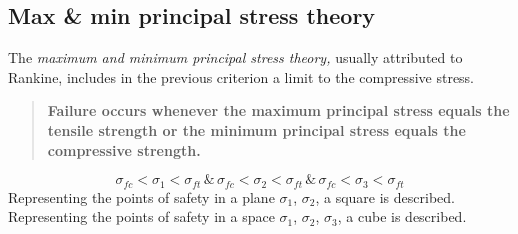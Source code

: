 \documentclass[class=report, crop=false, 12pt,a4paper]{standalone}
\begin{document}
\subsection{Max \& min principal stress theory}
The \textit{maximum and minimum principal stress theory,} usually attributed to Rankine, includes in the previous criterion a limit to the compressive stress.
\begin{quotation}
  \textbf{Failure occurs whenever the maximum principal stress equals the tensile strength or the minimum principal stress equals the compressive strength.}
\end{quotation} 
\begin{equation}
  \sigma_{fc} < \sigma_1 < \sigma_{ft} \, \& \, \sigma_{fc} < \sigma_2 < \sigma_{ft} \, \& \, \sigma_{fc} < \sigma_3 < \sigma_{ft} 
\end{equation}
Representing the points of safety in a plane $\sigma_1$, $\sigma_2$, a square is described. Representing the points of safety in a space $\sigma_1$, $\sigma_2$, $\sigma_3$, a cube is described.
\end{document}

